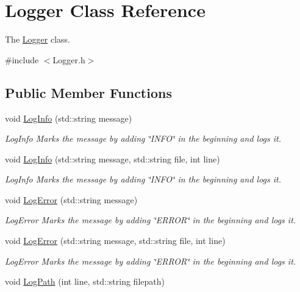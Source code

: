 \hypertarget{classLogger}{\section{Logger Class Reference}
\label{classLogger}
}


The \hyperlink{classLogger}{Logger} class.  




{\ttfamily \#include $<$Logger.\-h$>$}

\subsection*{Public Member Functions}
\begin{DoxyCompactItemize}
\item 
void \hyperlink{classLogger_a827cabc79ba0d1b654ad3f03058dfba2}{Log\-Info} (std\-::string message)
\begin{DoxyCompactList}\small\item\em Log\-Info Marks the message by adding \char`\"{}\-I\-N\-F\-O\char`\"{} in the beginning and logs it. \end{DoxyCompactList}\item 
void \hyperlink{classLogger_aa9c4ebaf5082990fa24afc105522a5a5}{Log\-Info} (std\-::string message, std\-::string file, int line)
\begin{DoxyCompactList}\small\item\em Log\-Info Marks the message by adding \char`\"{}\-I\-N\-F\-O\char`\"{} in the beginning and logs it. \end{DoxyCompactList}\item 
void \hyperlink{classLogger_abb89d37b3a3cbdef1f59273e498f9775}{Log\-Error} (std\-::string message)
\begin{DoxyCompactList}\small\item\em Log\-Error Marks the message by adding \char`\"{}\-E\-R\-R\-O\-R\char`\"{} in the beginning and logs it. \end{DoxyCompactList}\item 
void \hyperlink{classLogger_afc03fb34e6b57f2ec3955da71a6f1fe7}{Log\-Error} (std\-::string message, std\-::string file, int line)
\begin{DoxyCompactList}\small\item\em Log\-Error Marks the message by adding \char`\"{}\-E\-R\-R\-O\-R\char`\"{} in the beginning and logs it. \end{DoxyCompactList}\item 
void \hyperlink{classLogger_a022af6a50c02c7cd77f39b6a10a80dc4}{Log\-Path} (int line, std\-::string filepath)

\end{DoxyCompactItemize}
